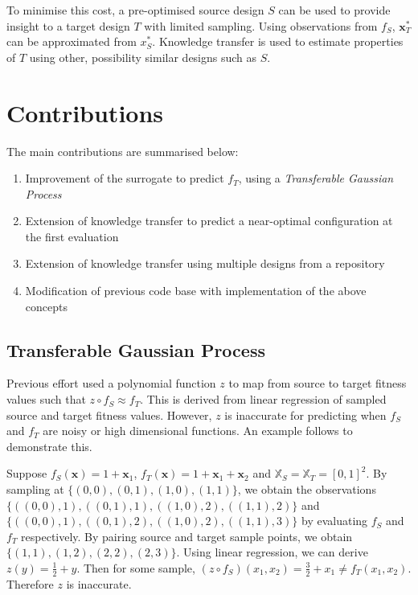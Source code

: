 \documentclass[10pt,a4paper]{article}
\begin{document}
To minimise this cost, a pre-optimised source design $S$ can be used to provide insight to a target design $T$ with limited sampling. Using observations from $f_S$, $\mathbf{x}_T^*$ can be approximated from $x_S^*$. Knowledge transfer is used to estimate properties of $T$ using other, possibility similar designs such as $S$.

\section{Contributions}

The main contributions are summarised below:
\begin{enumerate}
\item Improvement of the surrogate to predict $f_T$, using a \emph{Transferable Gaussian Process}
\item Extension of knowledge transfer to predict a near-optimal configuration at the first evaluation
\item Extension of knowledge transfer using multiple designs from a repository
\item Modification of previous code base\cite{Nicholson2015} with implementation of the above concepts
\end{enumerate}
\subsection{Transferable Gaussian Process}

Previous effort\cite{Kurek2016} used a polynomial function $z$ to map from source to target fitness values such that $z\circ f_S\approx f_T$. This is derived from linear regression of sampled source and target fitness values. However, $z$ is inaccurate for predicting when $f_S$ and $f_T$ are noisy or high dimensional functions. An example follows to demonstrate this.

Suppose $f_S(\mathbf{x})=1+\mathbf{x}_1$, $f_T(\mathbf{x})=1+\mathbf{x}_1+\mathbf{x}_2$ and $\mathbb{X}_S=\mathbb{X}_T=[0,1]^2$. By sampling at $\{(0,0),(0,1),(1,0),(1,1)\}$, we obtain the observations $\{((0,0),1),\allowbreak((0,1),1),((1,0),2),((1,1),2)\}$ and $\{((0,0),1),((0,1),2),((1,0),2),((1,1),3)\}$ by evaluating $f_S$ and $f_T$ respectively. By pairing source and target sample points, we obtain $\{(1,1),(1,2),(2,2),(2,3)\}$. Using linear regression, we can derive $z(y)=\frac{1}{2}+y$. Then for some sample, $(z\circ f_S)(x_1,x_2)=\frac{3}{2}+x_1\not=f_T(x_1,x_2)$. Therefore $z$ is inaccurate.
\end{document}

